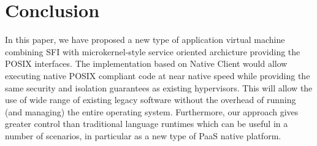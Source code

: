 \section{Conclusion}
\label{sec:conclusion}

In this paper, we have proposed a new type of application virtual
machine combining SFI with microkernel-style service oriented archicture
providing the POSIX interfaces. The implementation based on Native
Client would allow executing native POSIX compliant code at near native
speed while providing the same security and isolation guarantees as
existing hypervisors. This will allow the use of wide range of existing
legacy software without the overhead of running (and managing) the
entire operating system. Furthermore, our approach gives greater control
than traditional language runtimes which can be useful in a number of
scenarios, in particular as a new type of PaaS native platform.
